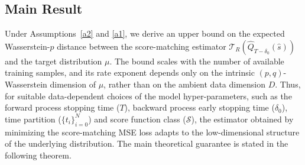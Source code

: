\documentclass[12pts]{article}
\newcommand{\sS}{ \mathscr{S}}
\newcommand{\sT}{ \mathscr{T}}
\newcommand{\hQ}{ \hat{Q}}
\begin{document}
\subsection{Main Result}\label{main results} 
Under Assumptions~\ref{a2} and \ref{a1}, we derive an upper bound on the expected Wasserstein-$p$ distance between the score-matching estimator $\sT_R(\hQ_{T-\delta_0}(\hat{s}))$ and the target distribution $\mu$. The bound scales with the number of available training samples, and its rate exponent depends only on the intrinsic $(p, q)$-Wasserstein dimension of $\mu$, rather than on the ambient data dimension $D$. Thus, for suitable data-dependent choices of the model hyper-parameters, such as the forward process stopping time ($T$), backward process early stopping time ($\delta_0$), time partition ($\{t_i\}_{i=0}^N$) and score function class ($\sS$), the estimator obtained by minimizing the score-matching MSE loss adapts to the low-dimensional structure of the underlying distribution. The main theoretical guarantee is stated in the following theorem.
\end{document}
